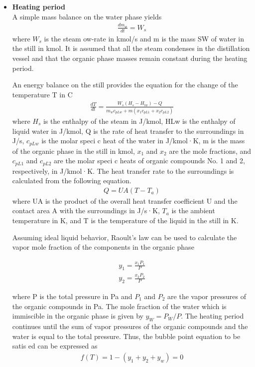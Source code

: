 \documentclass[12pt]{report}
\begin{document}
\begin{itemize}
\item{\textbf{Heating period}} \\
A simple mass balance on the water phase yields
\begin{gather*}
\frac{dm_w}{dt} = W_s 
\end{gather*}
where $W_s$ is the steam  ow-rate in kmol/s and m is the mass SW
of water in the still in kmol. It is assumed that all the steam condenses in the distillation vessel and that the organic phase masses remain constant during the heating period.

An energy balance on the still provides the equation for the change of the temperature T in \degree C
\begin{gather*}
\frac{dT}{dt} = \frac{W_s(H_s-H_{lw}) - Q}{m_wc_{pLw}+m(x_1c_{pL1}+x_2c_{pL2})}
\end{gather*}
where $H_s$ is the enthalpy of the steam in J/kmol, HLw is the enthalpy of liquid water in J/kmol, Q is the rate of heat transfer to the surroundings in J/s, $c_{pLw}$ is the molar speci c heat of the water in J/kmol·K, m is the mass of the organic phase in the still in kmol, $x_1$ and $x_2$ are the mole fractions, and $c_{pL1}$ and $c_{pL2}$ are the molar speci c heats of organic compounds No. 1 and 2, respectively, in J/kmol·K. The heat transfer rate to the surroundings is calculated from the following equation.
\begin{gather*}
Q = UA(T - T_a)
\end{gather*}
where UA is the product of the overall heat transfer coefficient U and the contact area A with the surroundings in J/s·K, $T_a$ is the ambient temperature in K, and T is the temperature of the liquid in the still in K.

Assuming ideal liquid behavior, Raoult's law can be used to calculate the vapor mole fraction of the components in the organic phase

\begin{gather*}
y_1 = \frac{x_1P_1}{P} \\
y_2 = \frac{x_2P_2}{P}
\end{gather*}

where P is the total pressure in Pa and $P_1$ and $P_2$ are the vapor pressures of the organic compounds in Pa. The mole fraction of the water which is immiscible in the organic phase is given by $y_W=P_W/P$. The heating period continues until the sum of vapor pressures of the organic compounds and the water is equal to the total pressure. Thus, the bubble point equation to be satis ed can be expressed as
\begin{gather*}
f(T) = 1 - (y_1+y_2+y_w) = 0
\end{gather*}


\end{itemize}
\end{document}
